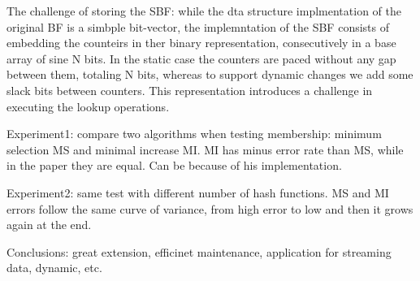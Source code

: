 \documentclass[a4paper, 10pt]{article}
\begin{document}
The challenge of storing the SBF: while the dta structure implmentation of the original BF is a simbple bit-vector, the implemntation of the SBF consists of embedding the counteirs in ther binary representation, consecutively in a base array of sine N bits. In the static case the counters are paced without any gap between them, totaling N bits, whereas to support dynamic changes we add some slack bits between counters. This representation introduces a challenge in executing the lookup operations.

Experiment1: compare two algorithms when testing membership: minimum selection MS and minimal increase MI. MI has minus error rate than MS, while in the paper they are equal. Can be because of his implementation.

Experiment2: same test with different number of hash functions. MS and MI errors follow the same curve of variance, from high error to low and then it grows again at the end.

Conclusions: great extension, efficinet maintenance, application for streaming data, dynamic, etc.
\end{document}
